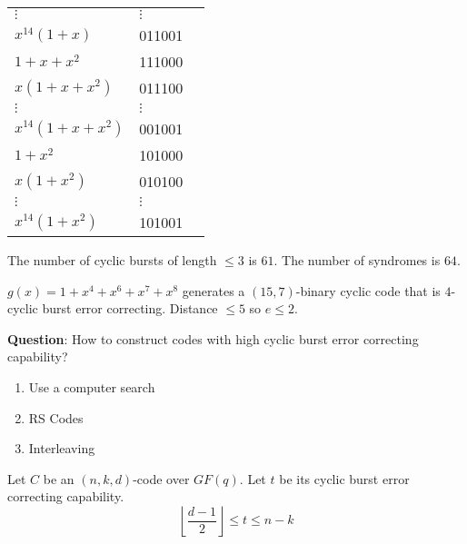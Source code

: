 \begin{table}[H]
\begin{tabularx}{\linewidth}{@{}YYY@{}}
        $ \vdots $          & $ \vdots $                                           \\
        $ x^{14}(1+x) $     & 011001                                               \\
        \midrule
        $ 1+x+x^2 $         & 111000                                               \\
        $ x(1+x+x^2) $      & 011100                                               \\
        $ \vdots $          & $ \vdots $                                           \\
        $ x^{14}(1+x+x^2) $ & 001001                                               \\
        \midrule
        $ 1+x^2 $           & 101000                                               \\
        $ x(1+x^2) $        & 010100                                               \\
        $ \vdots $          & $ \vdots $                                           \\
        $ x^{14}(1+x^2) $   & 101001                                               \\
    \end{tabularx}
\end{table}
The number of cyclic bursts of length $ \leqslant 3 $ is $ 61 $.
The number of syndromes is $ 64 $.

\begin{Example}{}{}
    $ g(x)=1+x^4+x^6+x^7+x^8 $ generates a $ (15,7) $-binary cyclic
    code that is $ 4 $-cyclic burst error correcting.
    Distance $ \leqslant 5 $ so $ e\leqslant 2 $.
\end{Example}

\textbf{Question}: How to construct codes with high cyclic burst error
correcting capability?
\begin{enumerate}[label=(\arabic*)]
    \item Use a computer search
    \item RS Codes
    \item Interleaving
\end{enumerate}

\begin{Theorem}{}{}
    Let $ C $ be an $ (n,k,d) $-code over $ GF(q) $. Let $ t $ be its
    cyclic burst error correcting capability.
    \[ \left\lfloor \frac{d-1}{2} \right\rfloor \leqslant t \leqslant n-k \]
\end{Theorem}

